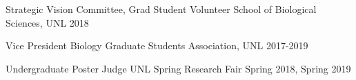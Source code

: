 \begin{cvoutreaches}
  \cvoutreach
    {Strategic Vision Committee, Grad Student Volunteer}
    {School of Biological Sciences, UNL}
    {2018}
    
  \cvoutreach
    {Vice President}
    {Biology Graduate Students Association, UNL}
    {2017-2019}
    
  \cvoutreach
    {Undergraduate Poster Judge}
    {UNL Spring Research Fair}
    {Spring 2018, Spring 2019}
\end{cvoutreaches}
